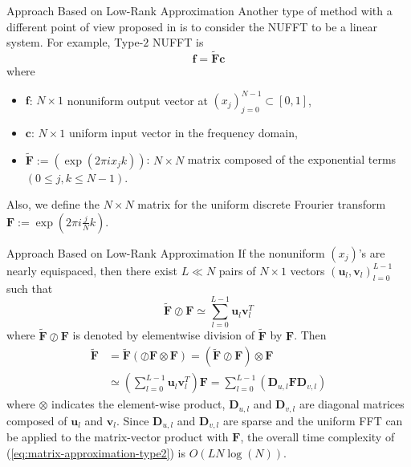 \documentclass{beamer}
\begin{document}
\begin{frame}{Approach Based on Low-Rank Approximation}
  Another type of method with a different point of view proposed in \cite{SISC-2018-Townsend}
  is to consider the NUFFT to be a linear system. For example, Type-$2$ NUFFT is
  \begin{equation}
    \bm{f} = \tilde{\bm{F}}\bm{c}
    \label{eq:matrix-vector-product-nufft-type-2}
  \end{equation}
  where
  \begin{itemize}
    \item $\bm{f}$: $N \times 1$ nonuniform output vector at $(x_j)_{j=0}^{N-1} \subset [0, 1]$,
    \item $\bm{c}$: $N \times 1$ uniform input vector in the frequency domain,
    \item $\tilde{\bm{F}} := \left(\exp(2\pi i x_{j}k)\right)$: $N \times N$ matrix composed of the exponential terms
    $(0 \le j, k \le N-1)$.
  \end{itemize}
  Also, we define the $N \times N$ matrix for the uniform discrete Frourier transform
  $\bm{F} := \exp(2\pi i \frac{j}{N}k)$.
\end{frame}

\begin{frame}{Approach Based on Low-Rank Approximation}
  If the nonuniform $(x_j)$'s are nearly equispaced, then there exist $L \ll N$ pairs of $N \times 1$
  vectors $(\bm{u}_l, \bm{v}_l)_{l=0}^{L-1}$ such that
  \begin{equation}
    \bm{\tilde{F}}\oslash\bm{F} \simeq
    \sum_{l=0}^{L-1}\bm{u}_{l}\bm{v}_{l}^{T}
  \end{equation}
  where $\tilde{\bm{F}}\oslash\bm{F}$ is denoted by elementwise division of $\tilde{\bm{F}}$ by $\bm{F}$. Then
  \begin{align}
       \tilde{\bm{F}}
    &= \tilde{\bm{F}}\left(\oslash\bm{F}\otimes\bm{F}\right)
     = \left(\tilde{\bm{F}}\oslash\bm{F}\right)\otimes\bm{F} \\
    &\simeq \left(\sum_{l=0}^{L-1}\bm{u}_{l}\bm{v}_{l}^{T}\right)\bm{F}
     = \sum_{l=0}^{L-1}\left(\bm{D}_{u,l}\bm{F}\bm{D}_{v,l}\right)
    \label{eq:matrix-approximation-type2}
  \end{align}
  where $\otimes$ indicates the element-wise product,
  $\bm{D}_{u,l}$ and $\bm{D}_{v,l}$ are diagonal matrices composed of $\bm{u}_{l}$ and $\bm{v}_{l}$.
  Since $\bm{D}_{u,l}$ and $\bm{D}_{v,l}$ are sparse and the uniform FFT can be applied to the matrix-vector product with $\bm{F}$, the overall time complexity of (\ref{eq:matrix-approximation-type2})
  is $O(L N \log(N))$.
\end{frame}
\end{document}
